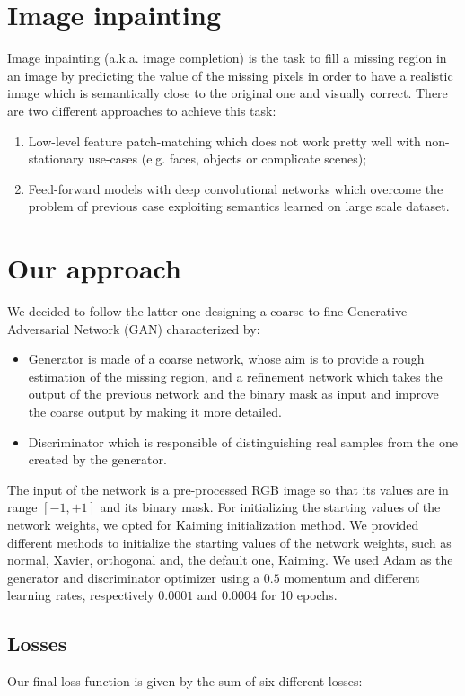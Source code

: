 \documentclass[10pt,twocolumn,letterpaper]{article}
\begin{document}
\section{Image inpainting}
Image inpainting (a.k.a. image completion) is the task to fill a missing region
in an image by predicting the value of the missing pixels in order to have a
realistic image which is semantically close to the original one and visually
correct. There are two different approaches to achieve this task:
\begin{enumerate}
  \item Low-level feature patch-matching which does not work pretty well with
    non-stationary use-cases (e.g. faces, objects or complicate scenes);
  \item	Feed-forward models with deep convolutional networks which overcome the
    problem of previous case exploiting semantics learned on large scale
    dataset.
\end{enumerate}
\section{Our approach}
We decided to follow the latter one designing a coarse-to-fine Generative
Adversarial Network (GAN) characterized by:
\begin{itemize}
	\item Generator is made of a coarse network, whose aim is to provide a rough
    estimation of the missing region, and a refinement network which takes the
    output of the previous network and the binary mask as input and improve the
    coarse output by making it more detailed.
  \item	Discriminator which is responsible of distinguishing real samples from
    the one created by the generator.
\end{itemize}
The input of the network is a pre-processed RGB image so that its values are in
range \([-1,+1]\) and its binary mask. For initializing the starting values of
the network weights, we opted for Kaiming initialization method. We provided
different methods to initialize the starting values of the network weights, such
as normal, Xavier, orthogonal and, the default one, Kaiming. We used Adam as the
generator and discriminator optimizer using a \(0.5\) momentum and different
learning rates, respectively \(0.0001\) and \(0.0004\) for 10 epochs.

\subsection{Losses}
Our final loss function is given by the sum of six different losses:
\end{document}
